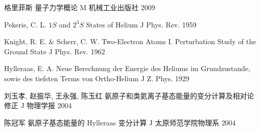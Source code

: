 {格里菲斯}
{量子力学概论}
{M}
{机械工业出版社}
{2009}
{}

{Pekeris, C. L.}
{$1S$ and $2^3S$ States of Helium}
{J}
{Phys. Rev.}
{1959}
{}

{Knight, R. E. \& Scherr, C. W.}
{Two-Electron Atoms I. Perturbation Study of the Ground State}
{J}
{Phys. Rev.}
{1962}
{}

{Hylleraas, E. A.}
{Neue Berechnung der Energie des Heliums im Grundzustande, sowie des tiefsten Terms von Ortho-Helium}
{J}
{Z. Phys.}
{1929}
{}

{刘玉孝, 赵振华, 王永强, 陈玉红}
{氨原子和类氦离子基态能量的变分计算及相对论修正}
{J}
{物理学报}
{2004}
{}

{陈冠军}
{氨原子基态能量的 Hylleraas 变分计算}
{J}
{太原师范学院物理系}
{2004}
{}
